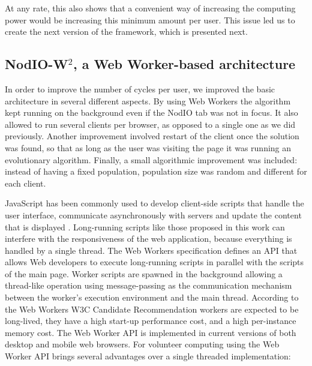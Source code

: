 \documentclass[journal,onecolumn]{IEEEtran}
\begin{document}
At any rate, this also shows that a convenient way of increasing the
computing power would be increasing this minimum amount per user. This
issue led us to create the next version of the framework, which is
presented next. %

\subsection{{\sf NodIO-W$^2$}, a Web Worker-based architecture}

In order to improve the number of cycles per user, we improved the
basic architecture in several different aspects. By using Web Workers %
the algorithm kept running on the background even if the {\sf NodIO}
tab was not in focus. It also allowed to run several clients per
browser, as opposed to a single one as we did previously. Another
improvement involved restart of the client once the solution was
found, so that as long as the user was visiting the page it was
running an evolutionary algorithm. Finally, a small algorithmic
improvement was included: instead of having a fixed population,
population size was random and different for each client. %

JavaScript has been commonly used to develop client-side scripts
that handle the user interface, communicate asynchronously with servers and
update the content that is displayed \cite{flanagan2006javascript}.
Long-running scripts like those proposed in this work can interfere with the
responsiveness of the web application, because everything is handled by a
single thread. The Web Workers specification \cite{hickson2012web} defines an
API that allows Web developers to execute long-running scripts in parallel
with the scripts of the main page. Worker scripts are spawned in the
background allowing a thread-like operation using message-passing as the
communication mechanism between the worker's execution environment and the
main thread. According to the Web Workers W3C Candidate Recommendation
\cite{hickson2012web} workers are expected to be long-lived, they have a high
start-up performance cost, and a high per-instance memory cost. The Web Worker
API is implemented in current versions of both desktop and mobile web browsers.
For volunteer computing using the Web Worker API brings several advantages
over a single threaded implementation:
\end{document}
